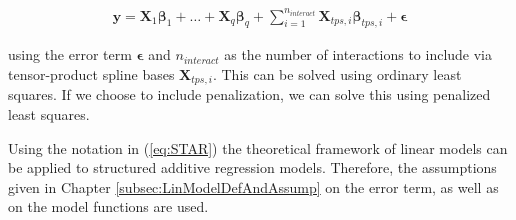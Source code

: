 \documentclass[10pt,a4paper]{article}
\begin{document}
\begin{align} \label{eq:STAR}
	\boldsymbol{y} = \boldsymbol{X}_1 \boldsymbol{\beta}_1 + \dots + \boldsymbol{X}_q \boldsymbol{\beta}_q + \sum_{i=1}^{n_{interact}} \boldsymbol{X}_{tps, i} \boldsymbol{\beta}_{tps,i} + \boldsymbol{\epsilon}
\end{align}

using the error term $\boldsymbol{\epsilon}$ and $n_{interact}$ as the number of interactions to include via tensor-product spline bases $\boldsymbol{X}_{tps,i}$. This can be solved using ordinary least squares. If we choose to include penalization, we can solve this using penalized least squares. 

Using the notation in (\ref{eq:STAR}) the theoretical framework of linear models can be applied to structured additive regression models. Therefore, the assumptions given in Chapter \ref{subsec:LinModelDefAndAssump} on the error term, as well as on the model functions are used. \cite{fahrmeir2004penalized}

\printbibliography
	
\end{document}
